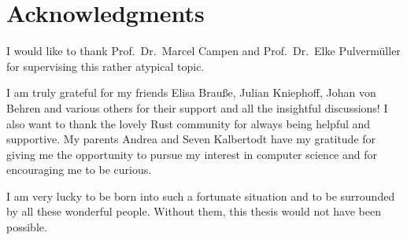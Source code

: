 \chapter*{Acknowledgments}

I would like to thank Prof.\ Dr.\ Marcel Campen and Prof.\ Dr.\ Elke Pulvermüller for supervising this rather atypical topic.

I am truly grateful for my friends Elisa Brauße, Julian Kniephoff, Johan von Behren and various others for their support and all the insightful discussions!
I also want to thank the lovely Rust community for always being helpful and supportive.
My parents Andrea and Seven Kalbertodt have my gratitude for giving me the opportunity to pursue my interest in computer science and for encouraging me to be curious.

I am very lucky to be born into such a fortunate situation and to be surrounded by all these wonderful people.
Without them, this thesis would not have been possible.








